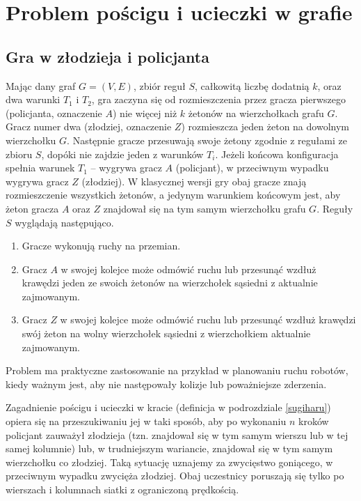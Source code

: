 \documentclass[brudnopis]{xmgr}
\theoremstyle{definition}
\begin{document}
\chapter{Problem pościgu i ucieczki w grafie}
\section{Gra w złodzieja i policjanta}\label{sec:poscig}
Mając dany graf $G=(V,E)$, zbiór reguł $S$, całkowitą liczbę dodatnią $k$, oraz dwa warunki $T_1$ i $T_2$, gra zaczyna się od rozmieszczenia przez gracza pierwszego (policjanta, oznaczenie $A$) nie więcej niż $k$ żetonów na wierzchołkach grafu $G$. Gracz numer dwa (złodziej, oznaczenie $Z$) rozmieszcza jeden żeton na dowolnym wierzchołku $G$. Następnie gracze przesuwają swoje żetony zgodnie z regułami ze zbioru $S$, dopóki nie zajdzie jeden z warunków $T_i$. Jeżeli końcowa konfiguracja spełnia warunek $T_1$ -- wygrywa gracz $A$ (policjant), w przeciwnym wypadku wygrywa gracz $Z$ (złodziej). W klasycznej wersji gry \cite{aigner} obaj gracze znają rozmieszczenie wszystkich żetonów, a jedynym warunkiem końcowym jest, aby żeton gracza $A$ oraz $Z$ znajdował się na tym samym wierzchołku grafu $G$.
Reguły $S$ wyglądają następująco.
\begin{enumerate}
  \item Gracze wykonują ruchy na przemian.
  \item Gracz $A$ w swojej kolejce może odmówić ruchu lub przesunąć wzdłuż krawędzi jeden ze swoich żetonów na wierzchołek sąsiedni z aktualnie zajmowanym.
  \item Gracz $Z$ w swojej kolejce może odmówić ruchu lub przesunąć wzdłuż krawędzi swój żeton na wolny wierzchołek sąsiedni z wierzchołkiem aktualnie zajmowanym.
\end{enumerate}

Problem ma praktyczne zastosowanie na przykład w planowaniu ruchu robotów, kiedy ważnym jest, aby nie następowały kolizje lub poważniejsze zderzenia.

Zagadnienie pościgu i ucieczki w kracie (definicja w podrozdziale \ref{sugiharu}) opiera się na przeszukiwaniu jej w taki sposób, aby po wykonaniu $n$ kroków policjant zauważył złodzieja (tzn. znajdował się w tym samym wierszu lub w tej samej kolumnie) lub, w trudniejszym wariancie, znajdował się w tym samym wierzchołku co złodziej. Taką sytuację uznajemy za zwycięstwo goniącego, w przeciwnym wypadku zwycięża złodziej. Obaj uczestnicy poruszają się tylko po wierszach i kolumnach siatki z ograniczoną prędkością.
\end{document}
